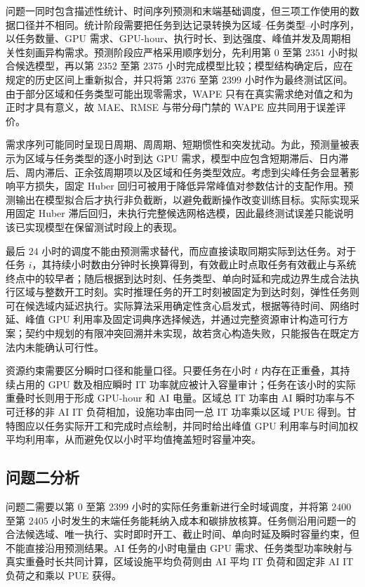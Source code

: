 \documentclass[withoutpreface,bwprint]{cumcmthesis}
\begin{document}
问题一同时包含描述性统计、时间序列预测和末端基础调度，但三项工作使用的数据口径并不相同。统计阶段需要把任务到达记录转换为区域--任务类型--小时序列，以任务数量、GPU 需求、GPU-hour、执行时长、到达强度、峰值并发及周期相关性刻画异构需求。预测阶段应严格采用顺序划分，先利用第 $0$ 至第 $2351$ 小时拟合候选模型，再以第 $2352$ 至第 $2375$ 小时完成模型比较；模型结构确定后，应在规定的历史区间上重新拟合，并只将第 $2376$ 至第 $2399$ 小时作为最终测试区间。由于部分区域和任务类型可能出现零需求，WAPE 只有在真实需求绝对值之和为正时才具有意义，故 MAE、RMSE 与带分母门禁的 WAPE 应共同用于误差评价。

需求序列可能同时呈现日周期、周周期、短期惯性和突发扰动。为此，预测量被表示为区域与任务类型的逐小时到达 GPU 需求，模型中应包含短期滞后、日内滞后、周内滞后、正余弦周期项以及区域和任务类型效应。考虑到尖峰任务会显著影响平方损失，固定 Huber 回归可被用于降低异常峰值对参数估计的支配作用。预测输出在模型拟合后才执行非负截断，以避免截断操作改变训练目标。实际实现采用固定 Huber 滞后回归，未执行完整候选网格选模，因此最终测试误差只能说明该已实现模型在保留测试时段上的表现。

最后 $24$ 小时的调度不能由预测需求替代，而应直接读取同期实际到达任务。对于任务 $i$，其持续小时数由分钟时长换算得到，有效截止时点取任务有效截止与系统终点中的较早者；随后根据到达时刻、任务类型、单向时延和完成边界生成合法执行区域与整数开工时刻。实时推理任务的开工时刻被固定为到达时刻，弹性任务则可在候选域内延迟执行。实际算法采用确定性贪心启发式，根据等待时间、网络时延、峰值 GPU 利用率及固定词典序选择候选，并通过完整资源审计构造可行方案；契约中规划的有限冲突回溯并未实现，故若贪心构造失败，只能报告在既定方法内未能确认可行性。

资源约束需要区分瞬时口径和能量口径。只要任务在小时 $t$ 内存在正重叠，其持续占用的 GPU 数及相应瞬时 IT 功率就应被计入容量审计；任务在该小时的实际重叠时长则用于形成 GPU-hour 和 AI 电量。区域总 IT 功率由 AI 瞬时功率与不可迁移的非 AI IT 负荷相加，设施功率由同一总 IT 功率乘以区域 PUE 得到。甘特图应以任务实际开工和完成时点绘制，并同时给出峰值 GPU 利用率与时间加权平均利用率，从而避免仅以小时平均值掩盖短时容量冲突。

\subsection{问题二分析}

问题二需要以第 $0$ 至第 $2399$ 小时的实际任务重新进行全时域调度，并将第 $2400$ 至第 $2405$ 小时发生的末端任务能耗纳入成本和碳排放核算。任务侧沿用问题一的合法候选域、唯一执行、实时即时开工、截止时间、单向时延及瞬时容量约束，但不能直接沿用预测结果。AI 任务的小时电量由 GPU 需求、任务类型功率映射与真实重叠时长共同计算，区域设施平均负荷则由 AI 平均 IT 负荷和固定非 AI IT 负荷之和乘以 PUE 获得。
\end{document}
